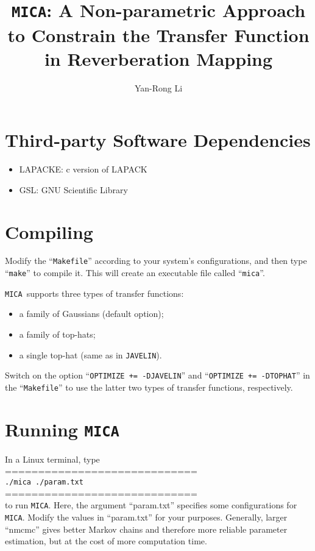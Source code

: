 \documentclass[preprint]{aastex}
\def\mica{{\texttt{MICA}}}
\begin{document}
\title{\texttt{MICA}: A Non-parametric Approach to Constrain the Transfer Function\\ in Reverberation Mapping}
\author{Yan-Rong Li}
\maketitle

\section{Third-party Software Dependencies}

\begin{itemize}
 \item LAPACKE: c version of LAPACK
 \item GSL:  GNU Scientific Library
\end{itemize}

\section{Compiling}
Modify the ``\texttt{Makefile}'' according to your system's configurations, and then type ``\texttt{make}''
to compile it. This will create an executable file called ``\texttt{mica}''.

\mica~supports three types of transfer functions:
\begin{itemize}
 \item a family of Gaussians (default option);
 \item a family of top-hats;
 \item a single top-hat (same as in \texttt{JAVELIN}).
\end{itemize}
Switch on the option ``\texttt{OPTIMIZE += -DJAVELIN}'' and ``\texttt{OPTIMIZE += -DTOPHAT}'' 
in the ``\texttt{Makefile}'' to use the latter two types of transfer functions, respectively.


\section{Running \texttt{MICA}}
In a Linux terminal, type\\
=============================\\
\texttt{./mica ./param.txt}\\
=============================\\
to run \texttt{MICA}. Here, the argument ``param.txt'' specifies some configurations for \texttt{MICA}.
Modify the values in ``param.txt'' for your purposes. Generally, larger ``nmcmc'' gives better Markov chains
and therefore more reliable parameter estimation, but at the cost of more computation time.
\end{document}
